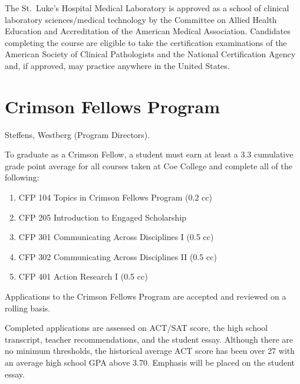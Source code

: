 \documentclass[
  letterpaper,
]{scrbook}
\providecommand{\tightlist}{%
  \setlength{\itemsep}{0pt}\setlength{\parskip}{0pt}}
\begin{document}
The St.~Luke's Hospital Medical Laboratory is approved as a school of
clinical laboratory sciences/medical technology by the Committee on
Allied Health Education and Accreditation of the American Medical
Association. Candidates completing the course are eligible to take the
certification examinations of the American Society of Clinical
Pathologists and the National Certification Agency and, if approved, may
practice anywhere in the United States.

\section{Crimson Fellows Program}\label{crimson-fellows-program}

Steffens, Westberg (Program Directors).

To graduate as a Crimson Fellow, a student must earn at least a 3.3
cumulative grade point average for all courses taken at Coe College and
complete all of the following:

\begin{enumerate}
\def\labelenumi{\arabic{enumi}.}
\tightlist
\item
  CFP 104 Topics in Crimson Fellows Program (0.2 cc)
\item
  CFP 205 Introduction to Engaged Scholarship
\item
  CFP 301 Communicating Across Disciplines I (0.5 cc)
\item
  CFP 302 Communicating Across Disciplines II (0.5 cc)
\item
  CFP 401 Action Research I (0.5 cc)
\end{enumerate}

Applications to the Crimson Fellows Program are accepted and reviewed on
a rolling basis.

Completed applications are assessed on ACT/SAT score, the high school
transcript, teacher recommendations, and the student essay. Although
there are no minimum thresholds, the historical average ACT score has
been over 27 with an average high school GPA above 3.70. Emphasis will
be placed on the student essay.
\end{document}
